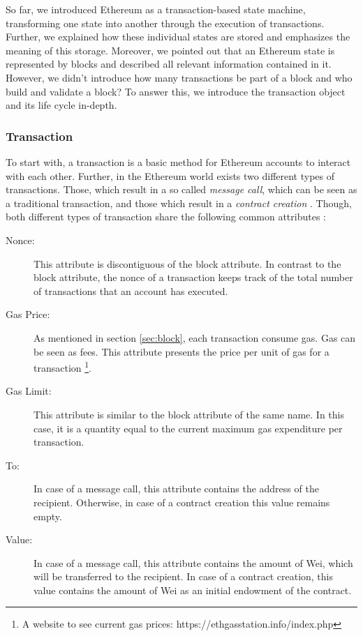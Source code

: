 So far, we introduced Ethereum as a transaction-based state machine, transforming 
one state into another through the execution of transactions. Further, we explained 
how these individual states are stored and emphasizes the meaning of this storage. 
Moreover, we pointed out that an Ethereum state is represented by blocks and described 
all relevant information contained in it.
However, we didn't introduce how many transactions be part 
of a block and who build and validate a block? To answer this, 
we introduce the transaction object and its life cycle in-depth.


\subsubsection{Transaction}
\label{sec:transaction}
To start with, a transaction is a basic method for Ethereum accounts to interact with each other. 
Further, in the Ethereum world exists two different types of transactions. 
Those, which result in a so called \textit{message call}, which can be seen as a 
traditional transaction, and those which result in a \textit{contract creation} . 
Though, both different types of transaction share the following common attributes :

\begin{description}
	\item[Nonce: ] This attribute is discontiguous of the block attribute. In contrast to the block attribute, the nonce of a transaction keeps track of the total number of transactions that an account has executed. 
	\item[Gas Price: ] As mentioned in section \ref{sec:block}, each transaction consume gas. Gas can be seen as fees. This attribute presents the price per unit of gas for a transaction \footnote{A website to see current gas prices: https://ethgasstation.info/index.php}. 
	\item[Gas Limit: ] This attribute is similar to the block attribute of the same name. In this case, it is a quantity equal to the current maximum gas expenditure per transaction.  
	\item[To: ] In case of a message call, this attribute contains the address of the recipient. Otherwise, in case of a contract creation this value remains empty. 
	\item[Value: ] In case of a message call, this attribute contains the amount of Wei, which will be transferred to the recipient. In case of a contract creation, this value contains the amount of Wei as an initial endowment of the contract.
\end{description}

